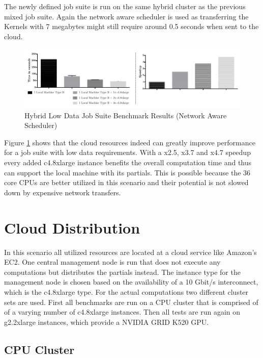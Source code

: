 The newly defined job suite is run on the same hybrid cluster as the previous mixed job suite. Again the network aware scheduler is used as transferring the Kernels with 7 megabytes might still require around 0.5 seconds when sent to the cloud.

\begin{figure}[!htb]
	\includegraphics[width=1.0\textwidth]{images/hybrid_lowdata_benchmark.pdf}
	\centering
	\caption{Hybrid Low Data Job Suite Benchmark Results (Network Aware Scheduler)}
	\label{img:hybrid_low_data_benchmark_results_network_aware}
\end{figure}

Figure \ref{img:hybrid_low_data_benchmark_results_network_aware} shows that the cloud resources indeed can greatly improve performance for a job suite with low data requirements. With a x2.5, x3.7 and x4.7 speedup every added c4.8xlarge instance benefits the overall computation time and thus can support the local machine with its partials. This is possible because the 36 core CPUs are better utilized in this scenario and their potential is not slowed down by expensive network transfers.

\section{Cloud Distribution}

In this scenario all utilized resources are located at a cloud service like Amazon's EC2. One central management node is run that does not execute any computations but distributes the partials instead. The instance type for the management node is chosen based on the availability of a 10 Gbit/s interconnect, which is the c4.8xlarge type. For the actual computations two different cluster sets are used. First all benchmarks are run on a CPU cluster that is comprised of of a varying number of c4.8xlarge instances. Then all tests are run again on g2.2xlarge instances, which provide a NVIDIA GRID K520 GPU.

\subsection{CPU Cluster}
